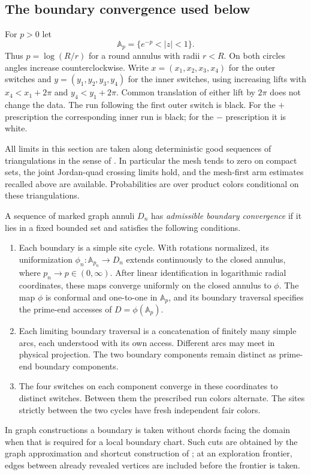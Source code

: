 \subsection{The boundary convergence used below}

For $p>0$ let
\[
 \mathbb A_p=\{e^{-p}<|z|<1\}.
\]
Thus $p=\log(R/r)$ for a round annulus with radii $r<R$.  On both circles
angles increase counterclockwise.  Write $x=(x_1,x_2,x_3,x_4)$ for the outer
switches and $y=(y_1,y_2,y_3,y_4)$ for the inner switches, using increasing
lifts with $x_4<x_1+2\pi$ and $y_4<y_1+2\pi$.  Common translation of either
lift by $2\pi$ does not change the data.  The run following the first outer
switch is black.  For the $+$ prescription the corresponding inner run is
black; for the $-$ prescription it is white.

All limits in this section are taken along deterministic good sequences
of triangulations in the sense of \cite[Section 2, ``Deterministic
sequences and Jordan tests'']{V}.  In particular the mesh tends to zero on
compact sets, the joint Jordan-quad crossing limits hold, and the
mesh-first arm estimates recalled above are available.  Probabilities are
over product colors conditional on these triangulations.

\begin{definition}\label{an:admissible}
A sequence of marked graph annuli $D_n$ has \emph{admissible boundary
convergence} if it lies in a fixed bounded set and satisfies the following
conditions.
\begin{enumerate}
\item Each boundary is a simple site cycle.  With rotations normalized,
its uniformization
$\phi_n:\mathbb A_{p_n}\longrightarrow D_n$ extends continuously to the
closed annulus, where $p_n\to p\in(0,\infty)$.  After linear identification
in logarithmic radial coordinates, these maps converge uniformly on the
closed annulus to $\phi$.  The map $\phi$ is conformal and one-to-one in
$\mathbb A_p$, and its boundary traversal specifies the prime-end accesses
of $D=\phi(\mathbb A_p)$.
\item Each limiting boundary traversal is a concatenation of finitely
many simple arcs, each understood with its own access.  Different arcs
may meet in physical projection.  The two boundary components remain
distinct as prime-end boundary components.
\item The four switches on each component converge in these coordinates
to distinct switches.  Between them the prescribed run colors alternate.
The sites strictly between the two cycles have fresh independent fair colors.
\end{enumerate}
In graph constructions a boundary is taken without chords facing the
domain when that is required for a local boundary chart.  Such cuts are
obtained by the graph approximation and shortcut construction of
\cite[Section 2]{V}; at an exploration frontier, edges between already
revealed vertices are included before the frontier is taken.
\end{definition}

